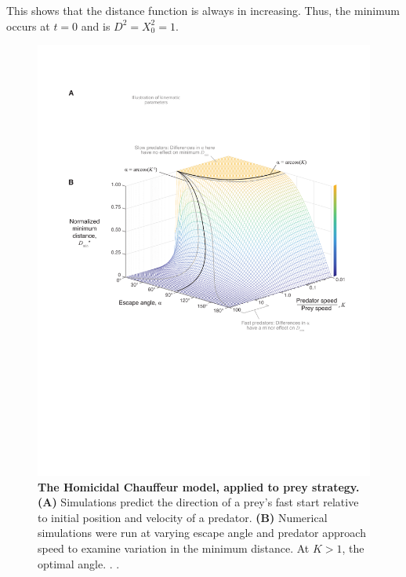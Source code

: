 \documentclass[12pt]{article}
\begin{document}
This shows that the distance function is always in increasing. Thus, the minimum occurs at $t=0$ and is $D^2 = X_0^2 = 1.$








\begin{figure}[t]
\begin{centering}
\includegraphics[width=1\textwidth]{Fig_01.pdf}
\centering	
\caption{\textbf{The Homicidal Chauffeur model, applied to prey strategy.} \textbf{(A)} Simulations predict the direction of a prey's fast start relative to initial position and velocity of a predator. \textbf{(B)} Numerical simulations were run at varying escape angle and predator approach speed to examine variation in the minimum distance. At $K>1$, the optimal angle. . .  }
\label{weihs_topo}
\end{centering}
\end{figure}

\pagebreak









\end{document}
